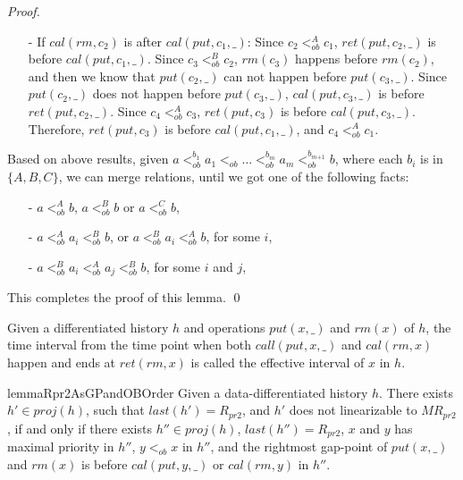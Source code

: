 \begin {proof}
\begin{itemize}
\begin{itemize}
    \item[-] If $\textit{cal}(\textit{rm},c_2)$ is after $\textit{cal}(\textit{put},c_1,\_)$: Since $c_2 <_{\textit{ob}}^A c_1$, $\textit{ret}(\textit{put},c_2,\_)$ is before $\textit{cal}(\textit{put},c_1,\_)$. Since $c_3 <_{\textit{ob}}^B c_2$, $\textit{rm}(c_3)$ happens before $\textit{rm}(c_2)$, and then we know that $\textit{put}(c_2,\_)$ can not happen before $\textit{put}(c_3,\_)$. Since $\textit{put}(c_2,\_)$ does not happen before $\textit{put}(c_3,\_)$, $\textit{cal}(\textit{put},c_3,\_)$ is before $\textit{ret}(\textit{put},c_2,\_)$. Since $c_4 <_{\textit{ob}}^A c_3$, $\textit{ret}(\textit{put},c_3)$ is before $\textit{cal}(\textit{put},c_3,\_)$. Therefore, $\textit{ret}(\textit{put},c_3)$ is before $\textit{cal}(\textit{put},c_1,\_)$, and $c_4 <_{\textit{ob}}^A c_1$.
    \end{itemize}

\end{itemize}

Based on above results, given $a <_{\textit{ob}}^{b_1} a_1 <_{\textit{ob}} \ldots <_{\textit{ob}}^{b_m} a_m <_{\textit{ob}}^{b_{\textit{m+1}}} b$, where each $b_i$ is in $\{ A,B,C \}$, we can merge relations, until we got one of the following facts:

\begin{itemize}
\setlength{\itemsep}{0.5pt}
\item[-] $a <_{\textit{ob}}^A b$, $a <_{\textit{ob}}^B b$ or $a <_{\textit{ob}}^C b$,

\item[-] $a <_{\textit{ob}}^A a_i <_{\textit{ob}}^B b$, or $a <_{\textit{ob}}^B a_i <_{\textit{ob}}^A b$, for some $i$,

\item[-] $a <_{\textit{ob}}^B a_i <_{\textit{ob}}^A a_j <_{\textit{ob}}^B b$, for some $i$ and $j$,
\end{itemize}

This completes the proof of this lemma. \qed
\end {proof}


Given a differentiated history $h$ and operations $\textit{put}(x,\_)$ and $\textit{rm}(x)$ of $h$, the time interval from the time point when both $\textit{call}(\textit{put},x,\_)$ and $\textit{cal}(\textit{rm},x)$ happen and ends at $\textit{ret}(\textit{rm},x)$ is called the effective interval of $x$ in $h$.


\begin{restatable}{lemma}{Rpr2AsGPandOBOrder}
\label{lemma:Rpr2 as gap-point and ob order}
Given a data-differentiated history $h$. There exists $h' \in \textit{proj}(h)$, such that $\textit{last}(h') = R_{\textit{pr2}}$, and $h'$ does not linearizable to $\textit{MR}_{\textit{pr2}}$, if and only if there exists $h'' \in \textit{proj}(h)$, $\textit{last}(h'') = R_{\textit{pr2}}$, $x$ and $y$ has maximal priority in $h''$, $y <_{\textit{ob}} x$ in $h''$, and the rightmost gap-point of $\textit{put}(x,\_)$ and $\textit{rm}(x)$ is before $\textit{cal}(\textit{put},y,\_)$ or $\textit{cal}(\textit{rm},y)$ in $h''$.
\end{restatable}


